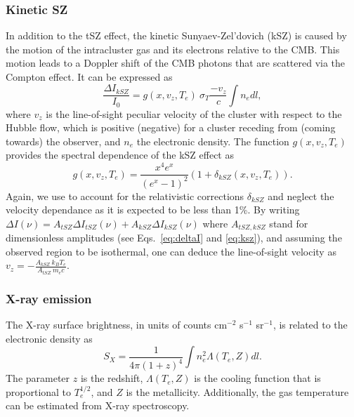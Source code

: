\documentclass[twocolumn,traditabstract]{aa}
\begin{document}
\subsubsection{Kinetic SZ}\label{sec:ksz}
In addition to the tSZ effect, the kinetic Sunyaev-Zel'dovich (kSZ) is caused by the motion of the intracluster gas and its electrons relative to the CMB. This motion leads to a Doppler shift of the CMB photons that are scattered via the Compton effect. It can be expressed as \citep{birkinshaw1999}
\begin{equation}
\frac{\Delta I_{kSZ}}{I_0} = g(x, v_z, T_e) \ \sigma_T \frac{-v_z}{c} \int n_e dl,
	\label{eq:ksz}
\end{equation}
where $v_z$ is the line-of-sight peculiar velocity of the cluster with respect to the Hubble flow, which is positive (negative) for a cluster receding from (coming towards) the observer, and $n_e$ the electronic density. The function $g(x, v_z, T_e)$ provides the spectral dependence of the kSZ effect as 
\begin{equation}
	g(x, v_z, T_e) = \frac{x^4 e^x}{\left(e^x-1\right)^2} \left( 1 + \delta_{kSZ}(x, v_z, T_e) \right).
	\label{eq:ksz_spec}
\end{equation}
Again, we use \cite{itoh1998} to account for the relativistic corrections $\delta_{kSZ}$ and neglect the velocity dependance as it is expected to be less than 1\%. By writing $\Delta I (\nu) = A_{tSZ} \Delta I_{tSZ}(\nu) + A_{kSZ} \Delta I_{kSZ}(\nu)$ where $A_{tSZ,kSZ}$ stand for dimensionless amplitudes (see Eqs.~\ref{eq:deltaI} and \ref{eq:ksz}), and assuming the observed region to be isothermal, one can deduce the line-of-sight velocity as $v_z = -\frac{A_{kSZ} \ k_B T_e}{A_{tSZ} \ m_e c}$.

\subsubsection{X-ray emission}\label{sec:xray}
The \mbox{X-ray} surface brightness, in units of counts cm$^{-2}$ s$^{-1}$ sr$^{-1}$, is related to the electronic density as
\begin{equation}
	S_X = \frac{1}{4 \pi (1+z)^4} \int n_e^2 \Lambda(T_e, Z) dl.
\label{eq:SX}
\end{equation}
The parameter $z$ is the redshift, $\Lambda(T_e, Z)$ is the cooling function that is proportional to $T_e^{1/2}$, and $Z$ is the metallicity. Additionally, the gas temperature can be estimated from \mbox{X-ray} spectroscopy. 
\end{document}
